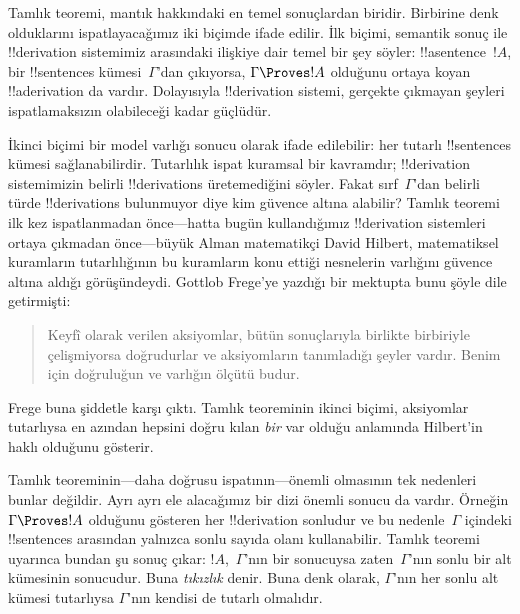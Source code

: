 \documentclass[../../../include/open-logic-section]{subfiles}
\begin{document}
      {}
      {}


Tamlık teoremi, mantık hakkındaki en temel sonuçlardan biridir.
Birbirine denk olduklarını ispatlayacağımız iki biçimde ifade edilir.
İlk biçimi, semantik sonuç ile !!{derivation} sistemimiz arasındaki
ilişkiye dair temel bir şey söyler: !!a{sentence}~$!A$, bir
!!{sentence}s kümesi~$\Gamma$'dan çıkıyorsa, $\Gamma \Proves !A$
olduğunu ortaya koyan !!a{derivation} da vardır. Dolayısıyla
!!{derivation} sistemi, gerçekte çıkmayan şeyleri ispatlamaksızın
olabileceği kadar güçlüdür.

İkinci biçimi bir model varlığı sonucu olarak ifade edilebilir: her
tutarlı !!{sentence}s kümesi sağlanabilirdir. Tutarlılık ispat
kuramsal bir kavramdır; !!{derivation} sistemimizin belirli
!!{derivation}s üretemediğini söyler. Fakat sırf~$\Gamma$'dan belirli
türde !!{derivation}s bulunmuyor diye
 kim güvence altına
alabilir? Tamlık teoremi ilk kez ispatlanmadan önce---hatta bugün
kullandığımız !!{derivation} sistemleri ortaya çıkmadan önce---büyük
Alman matematikçi David Hilbert, matematiksel kuramların tutarlılığının
bu kuramların konu ettiği nesnelerin varlığını güvence altına aldığı
görüşündeydi. Gottlob Frege'ye yazdığı bir mektupta bunu şöyle dile
getirmişti:
\begin{quote}
  Keyfî olarak verilen aksiyomlar, bütün sonuçlarıyla birlikte birbiriyle
  çelişmiyorsa doğrudurlar ve aksiyomların tanımladığı şeyler vardır. Benim
  için doğruluğun ve varlığın ölçütü budur.
\end{quote}
Frege buna şiddetle karşı çıktı. Tamlık teoreminin ikinci biçimi,
aksiyomlar tutarlıysa en azından hepsini doğru kılan \emph{bir}
 var olduğu anlamında
Hilbert'in haklı olduğunu gösterir.

Tamlık teoreminin---daha doğrusu ispatının---önemli olmasının tek
nedenleri bunlar değildir. Ayrı ayrı ele alacağımız bir dizi önemli
sonucu da vardır. Örneğin $\Gamma \Proves !A$ olduğunu gösteren her
!!{derivation} sonludur ve bu nedenle~$\Gamma$ içindeki
!!{sentence}s arasından yalnızca sonlu sayıda olanı kullanabilir.
Tamlık teoremi uyarınca bundan şu sonuç çıkar: $!A$,~$\Gamma$'nın bir
sonucuysa zaten~$\Gamma$'nın sonlu bir alt kümesinin sonucudur. Buna
\emph{tıkızlık} denir. Buna denk olarak, $\Gamma$'nın her sonlu alt
kümesi tutarlıysa $\Gamma$'nın kendisi de tutarlı olmalıdır.
\end{document}

